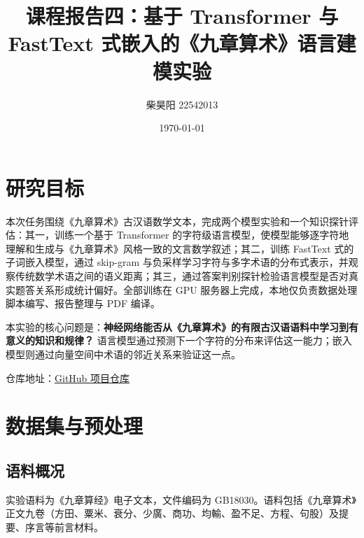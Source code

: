 \documentclass[UTF8,a4paper,twocolumn]{ctexart}
\title{课程报告四：基于 Transformer 与 FastText 式嵌入的《九章算术》语言建模实验}
\author{柴昊阳 22542013}
\date{\today}
\begin{document}
\maketitle
\small

\section{研究目标}

本次任务围绕《九章算术》古汉语数学文本，完成两个模型实验和一个知识探针评估：其一，训练一个基于 Transformer 的字符级语言模型，使模型能够逐字符地理解和生成与《九章算术》风格一致的文言数学叙述；其二，训练 FastText 式的子词嵌入模型，通过 skip-gram 与负采样学习字符与多字术语的分布式表示，并观察传统数学术语之间的语义距离；其三，通过答案判别探针检验语言模型是否对真实题答关系形成统计偏好。全部训练在 GPU 服务器上完成，本地仅负责数据处理脚本编写、报告整理与 PDF 编译。

本实验的核心问题是：\textbf{神经网络能否从《九章算术》的有限古汉语语料中学习到有意义的知识和规律？} 语言模型通过预测下一个字符的分布来评估这一能力；嵌入模型则通过向量空间中术语的邻近关系来验证这一点。

仓库地址：\href{https://github.com/sidchy/math3705m-neural-networks-assignments}{GitHub 项目仓库}

\section{数据集与预处理}

\subsection{语料概况}

实验语料为《九章算经》电子文本，文件编码为 GB18030。语料包括《九章算术》正文九卷（方田、粟米、衰分、少廣、商功、均輸、盈不足、方程、句股）及提要、序言等前言材料。

\end{document}
